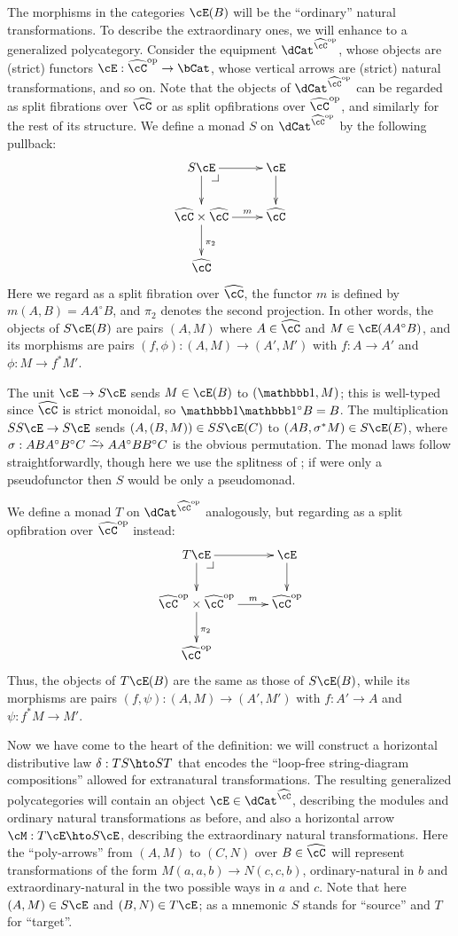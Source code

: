 \documentclass{amsart}
\newcommand{\C}{\cC}
\renewcommand{\Chat}{\ensuremath{\widehat{\C}}\xspace}
\newcommand{\E}{\cE}
\newcommand{\one}{\lone}
\renewcommand{\o}{^{\circ}}
\begin{document}
The morphisms in the categories $\E(B)$ will be the ``ordinary'' natural transformations.
To describe the extraordinary ones, we will enhance \E to a generalized polycategory.
Consider the equipment $\dCat^{\Chat\op}$, whose objects are (strict) functors $\E:\Chat\op\to\bCat$, whose vertical arrows are (strict) natural transformations, and so on.
Note that the objects of $\dCat^{\Chat\op}$ can be regarded as split fibrations over $\Chat$ or as split opfibrations over $\Chat\op$, and similarly for the rest of its structure.
We define a monad $S$ on $\dCat^{\Chat\op}$ by the following pullback:
\[ \xymatrix{ S \E \ar[r] \ar[d] \pullback & \E \ar[d] \\
  \Chat\times\Chat \ar[r]^-m \ar[d]^{\pi_2} & \Chat \\
  \Chat }\]
Here we regard \E as a split fibration over \Chat, the functor $m$ is defined by $m(A,B) = A A\o B$, and $\pi_2$ denotes the second projection.
In other words, the objects of $S\E(B)$ are pairs $(A,M)$ where $A\in\Chat$ and $M\in\E(A A\o B)$, and its morphisms are pairs $(f,\phi) : (A,M)\to (A',M')$ with $f:A\to A'$ and $\phi : M \to f^*M'$.

The unit $\E\to S\E$ sends $M\in \E(B)$ to $(\one,M)$; this is well-typed since $\Chat$ is strict monoidal, so $\one\one\o B = B$.
The multiplication $SS\E\to S\E$ sends $(A,(B,M)) \in S S \E(C)$ to $(AB,\sigma^* M)\in S\E(E)$, where $\sigma : ABA\o B\o C \toiso A A\o B B\o C$ is the obvious permutation.
The monad laws follow straightforwardly, though here we use the splitness of \E; if \E were only a pseudofunctor then $S$ would be only a pseudomonad.

We define a monad $T$ on $\dCat^{\Chat\op}$ analogously, but regarding \E as a split opfibration over $\Chat\op$ instead:
\[ \xymatrix{ T \E \ar[r] \ar[d] \pullback & \E \ar[d] \\
  \Chat\op\times\Chat\op \ar[r]^-m \ar[d]^{\pi_2} & \Chat\op \\
  \Chat\op }\]
Thus, the objects of $T\E(B)$ are the same as those of $S\E(B)$, while its morphisms are pairs $(f,\psi) : (A,M)\to (A',M')$ with $f:A'\to A$ and $\psi : f^* M \to M'$.

Now we have come to the heart of the definition: we will construct a horizontal distributive law $\delta : TS \hto ST$ that encodes the ``loop-free string-diagram compositions'' allowed for extranatural transformations.
The resulting generalized polycategories will contain an object $\E\in \dCat^{\Chat}$, describing the modules and ordinary natural transformations as before, and also a horizontal arrow $\cM: T\E \hto S\E$, describing the extraordinary natural transformations.
Here the ``poly-arrows'' from $(A,M)$ to $(C,N)$ over $B\in\Chat$ will represent transformations of the form $M(a,a,b) \to N(c,c,b)$, ordinary-natural in $b$ and extraordinary-natural in the two possible ways in $a$ and $c$.
Note that here $(A,M)\in S\E$ and $(B,N)\in T\E$; as a mnemonic $S$ stands for ``source'' and $T$ for ``target''.
\end{document}
